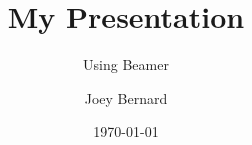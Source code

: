 \documentclass{beamer}
\title{My Presentation}
\subtitle{Using Beamer}
\author{Joey Bernard}
\institute{University of New Brunswick}
\date{\today}
\begin{document}
\begin{frame}
  \titlepage
\end{frame}

\begin{frame}

\end{frame}
\end{document}
